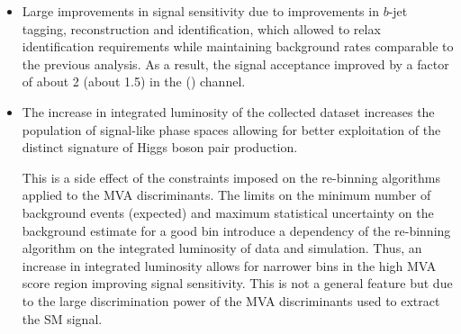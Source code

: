 \begin{itemize}

\item Large improvements in signal sensitivity due to improvements in
  $b$-jet tagging, \tauhadvis reconstruction and identification, which
  allowed to relax identification requirements while maintaining
  background rates comparable to the previous analysis. %
  As a result, the signal acceptance improved by a factor of about 2
  (about 1.5) in the \hadhad (\lephad) channel.

\item The increase in integrated luminosity of the collected dataset
  increases the population of signal-like phase spaces allowing for
  better exploitation of the distinct signature of Higgs boson pair
  production.

  This is a side effect of the constraints imposed on the re-binning
  algorithms applied to the MVA discriminants. The limits on the
  minimum number of background events (expected) and maximum
  statistical uncertainty on the background estimate for a good bin
  introduce a dependency of the re-binning algorithm on the integrated
  luminosity of data and simulation. Thus, an increase in integrated
  luminosity allows for narrower bins in the high MVA score region
  improving signal sensitivity. This is not a general feature but due
  to the large discrimination power of the MVA discriminants used to
  extract the SM \HH signal.
\end{itemize}



